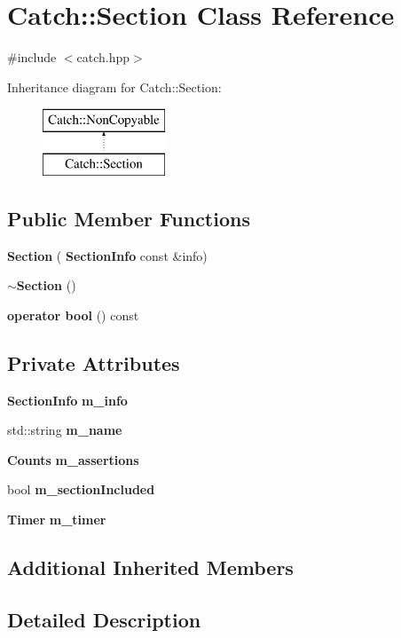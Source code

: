 \section{Catch\+::Section Class Reference}
\label{class_catch_1_1_section}


{\ttfamily \#include $<$catch.\+hpp$>$}

Inheritance diagram for Catch\+::Section\+:\begin{figure}[H]
\begin{center}
\leavevmode
\includegraphics[height=2.000000cm]{class_catch_1_1_section}
\end{center}
\end{figure}
\subsection*{Public Member Functions}
\begin{DoxyCompactItemize}
\item 
\textbf{ Section} (\textbf{ Section\+Info} const \&info)
\item 
\textbf{ $\sim$\+Section} ()
\item 
\textbf{ operator bool} () const
\end{DoxyCompactItemize}
\subsection*{Private Attributes}
\begin{DoxyCompactItemize}
\item 
\textbf{ Section\+Info} \textbf{ m\+\_\+info}
\item 
std\+::string \textbf{ m\+\_\+name}
\item 
\textbf{ Counts} \textbf{ m\+\_\+assertions}
\item 
bool \textbf{ m\+\_\+section\+Included}
\item 
\textbf{ Timer} \textbf{ m\+\_\+timer}
\end{DoxyCompactItemize}
\subsection*{Additional Inherited Members}


\subsection{Detailed Description}


